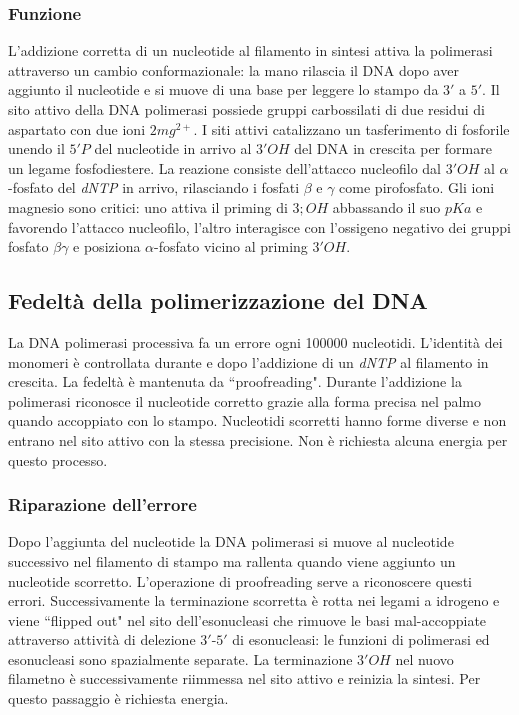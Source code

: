 \subsubsection{Funzione}
L'addizione corretta di un nucleotide al filamento in sintesi attiva la polimerasi attraverso un cambio conformazionale: la mano rilascia il DNA dopo aver aggiunto il nucleotide e si 
muove di una base per leggere lo stampo da $3'$ a $5'$. Il sito attivo della DNA polimerasi possiede gruppi carbossilati di due residui di aspartato con due ioni $2mg^{2+}$. I siti
attivi catalizzano un tasferimento di fosforile unendo il $5'P$ del nucleotide in arrivo al $3'OH$ del DNA in crescita per formare un legame fosfodiestere. La reazione consiste 
dell'attacco nucleofilo dal $3'OH$ al $\alpha$-fosfato del \emph{dNTP} in arrivo, rilasciando i fosfati $\beta$ e $\gamma$ come pirofosfato. Gli ioni magnesio sono critici: uno attiva 
il priming di $3;OH$ abbassando il suo $pKa$ e favorendo l'attacco nucleofilo, l'altro interagisce con l'ossigeno negativo dei gruppi fosfato $\beta\gamma$ e posiziona $\alpha$-fosfato
vicino al priming $3'OH$. 
\subsection{Fedelt\`a della polimerizzazione del DNA}
La DNA polimerasi processiva fa un errore ogni \num{100000} nucleotidi. L'identit\`a dei monomeri \`e controllata durante e dopo l'addizione di un \emph{dNTP} al filamento in crescita. 
La fedelt\`a \`e mantenuta da ``proofreading". Durante l'addizione la polimerasi riconosce il nucleotide corretto grazie alla forma precisa nel palmo quando accoppiato con lo stampo. 
Nucleotidi scorretti hanno forme diverse e non entrano nel sito attivo con la stessa precisione. Non \`e richiesta alcuna energia per questo processo. 
\subsubsection{Riparazione dell'errore}
Dopo l'aggiunta del nucleotide la DNA polimerasi si muove al nucleotide successivo nel filamento di stampo ma rallenta quando viene aggiunto un nucleotide scorretto. L'operazione di 
proofreading serve a riconoscere questi errori. Successivamente la terminazione scorretta \`e rotta nei legami a idrogeno e viene ``flipped out" nel sito dell'esonucleasi che rimuove 
le basi mal-accoppiate attraverso attivit\`a di delezione $3'$-$5'$ di esonucleasi: le funzioni di polimerasi ed esonucleasi sono spazialmente separate. La terminazione $3'OH$ nel nuovo
filametno \`e successivamente riimmessa nel sito attivo e reinizia la sintesi. Per questo passaggio \`e richiesta energia. 
